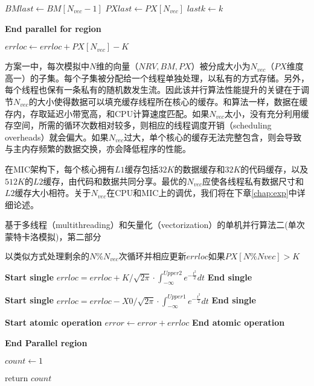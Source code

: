 \begin{algorithm}
\begin{algorithmic}[1]
    \State $BMlast \gets BM[N_{vec}-1]$
    \State $PXlast \gets PX[N_{vec}]$
    \State $lastk \gets k$

    \EndFor
    \State \textbf{End parallel for region}

    \State $errloc \gets errloc + PX[N_{vec}] - K$ 
    \EndIf
    \EndIf

    \end{algorithmic}
  \end{algorithm}

方案一中，每次模拟中$N$维的向量（$NRV, BM, PX$）被分成大小为$N_{vec}$（$PX$维度高一）的子集。每个子集被分配给一个线程单独处理，以私有的方式存储。另外，每个线程也保有一条私有的随机数发生流。因此该并行算法性能提升的关键在于调节$N_{vec}$的大小使得数据可以填充缓存线程所在核心的缓存。和算法\label{alg:omp1}一样，数据在缓存内，存取延迟小带宽高，和CPU计算速度匹配。如果$N_{vec}$太小，没有充分利用缓存空间，所需的循环次数相对较多，则相应的线程调度开销（scheduling overheads）就会偏大。如果$N_{vec}$过大，单个核心的缓存无法完整包含，则会导致与主内存频繁的数据交换，亦会降低程序的性能。

在MIC架构下，每个核心拥有$L1$缓存包括$32K$的数据缓存和$32K$的代码缓存，以及$512K$的$L2$缓存，由代码和数据共同分享。最优的$N_{vec}$应使各线程私有数据尺寸和$L2$缓存大小相符。关于$N_{vec}$在CPU和MIC上的调优，我们将在下章\ref{chap:exp}中详细论述。


\begin{algorithm}
  \caption{基于多线程（multithreading）和矢量化（vectorization）的单机并行算法二(单次蒙特卡洛模拟)，第二部分}
  \label{alg:omp2_2}
  \begin{algorithmic}[1]

    \State $以类似方式处理剩余的N\%N_{vec}次循环并相应更新errloc如果PX[N\%Nvec]>K$
    
    \State \textbf{Start single} 
    \State $errloc = errloc + K/\sqrt{2\pi} \cdot \int_{-\infty}^{Upper2}e^{-\frac{t^2}{2}}dt$
    \State \textbf{End single}

    \State \textbf{Start single} 
    \State $errloc = errloc - X0/\sqrt{2\pi}\cdot \int_{-\infty}^{Upper1}e^{-\frac{t^2}{2}}dt$
    \State \textbf{End single}

    
    \State \textbf{Start atomic operation} 
    \State $error \gets error + errloc$
    \State \textbf{End atomic operation}

    \State \textbf{End Parallel region}    

    \State $count \gets 1$
    \EndIf
    
    \State return $count$

    \EndProcedure
  \end{algorithmic}
\end{algorithm}

